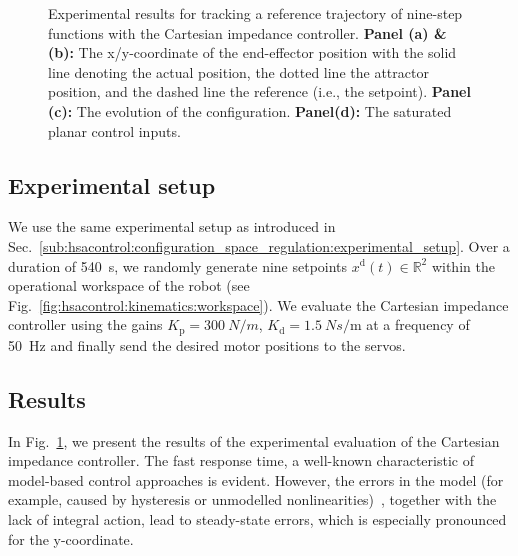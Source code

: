 \begin{figure}[t]
    \caption{Experimental results for tracking a reference trajectory of nine-step functions with the Cartesian impedance controller. \textbf{Panel (a) \& (b):} The x/y-coordinate of the end-effector position with the solid line denoting the actual position, the dotted line the attractor position, and the dashed line the reference (i.e., the setpoint).
    \textbf{Panel (c):} The evolution of the configuration.
    \textbf{Panel(d):} The saturated planar control inputs. }\label{fig:hsacontrol:experimental_results:task_space_impedance_control}
\end{figure}

\subsection{Experimental setup}
We use the same experimental setup as introduced in Sec.~\ref{sub:hsacontrol:configuration_space_regulation:experimental_setup}.
Over a duration of \SI{540}{s}, we randomly generate nine setpoints $x^\mathrm{d}(t) \in \mathbb{R}^2$ within the operational workspace of the robot (see Fig.~\ref{fig:hsacontrol:kinematics:workspace}).
We evaluate the Cartesian impedance controller using the gains $K_\mathrm{p} = \SI{300}{N \per m}$, $K_\mathrm{d} = \SI{1.5}{N s \per \meter}$ at a frequency of \SI{50}{Hz} and finally send the desired motor positions to the servos.


\subsection{Results}
In Fig.~\ref{fig:hsacontrol:experimental_results:task_space_impedance_control}, we present the results of the experimental evaluation of the Cartesian impedance controller. 
The fast response time, a well-known characteristic of model-based control approaches is evident. However, the errors in the model (for example, caused by hysteresis or unmodelled nonlinearities)~\citep{stolzle2024experimental}, together with the lack of integral action, lead to steady-state errors, which is especially pronounced for the y-coordinate.


